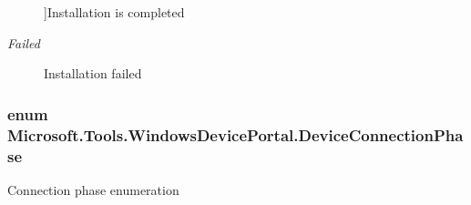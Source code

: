 \begin{Desc}
\begin{description}
{}]Installation is completed \item[{\em 
Failed\hypertarget{namespace_microsoft_1_1_tools_1_1_windows_device_portal_a6d809b60c74a8dfeca3698554f0afb6dad7c8c85bf79bbe1b7188497c32c3b0ca}{}\label{namespace_microsoft_1_1_tools_1_1_windows_device_portal_a6d809b60c74a8dfeca3698554f0afb6dad7c8c85bf79bbe1b7188497c32c3b0ca}
}]Installation failed \end{description}
\end{Desc}
\subsubsection[{\texorpdfstring{Device\+Connection\+Phase}{DeviceConnectionPhase}}]{\setlength{\rightskip}{0pt plus 5cm}enum {\bf Microsoft.\+Tools.\+Windows\+Device\+Portal.\+Device\+Connection\+Phase}\hspace{0.3cm}{\ttfamily [strong]}}\hypertarget{namespace_microsoft_1_1_tools_1_1_windows_device_portal_a5d17e74cf37845e22e0498ad89a3bc66}{}\label{namespace_microsoft_1_1_tools_1_1_windows_device_portal_a5d17e74cf37845e22e0498ad89a3bc66}


Connection phase enumeration 

